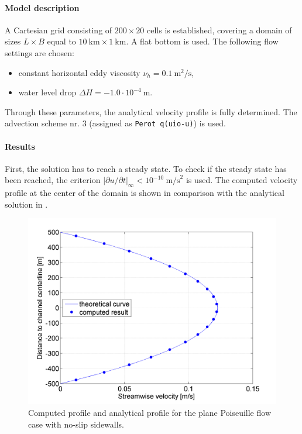 \paragraph*{Model description}
A Cartesian grid consisting of $200 \times 20$ cells is established, covering a domain of sizes $L \times B$ equal to $10~\textrm{km} \times 1~\textrm{km}$. A flat bottom is used. The following flow settings are chosen:
\begin{itemize}
\item constant horizontal eddy viscosity $\nu_h = 0.1~\textrm{m}^2/\textrm{s}$,
\item water level drop $\Delta H = -1.0\cdot10^{-4}~\textrm{m}$.
\end{itemize}
Through these parameters, the analytical velocity profile is fully determined. The advection scheme nr. 3 (assigned as \texttt{Perot q(uio-u)}) is used. 



\paragraph*{Results}
First, the solution has to reach a steady state. To check if the steady state has been reached, the criterion $|\partial u / \partial t |_{\infty} < 10^{-10}~\textrm{m/s}^2$ is used. The computed velocity profile at the center of the domain is shown in comparison with the analytical solution in .

\begin{figure}[h!]
\begin{center}
\includegraphics[width=0.65\columnwidth]{figures/poiseuillenoslip.png}
\end{center}\caption{Computed profile and analytical profile for the plane Poiseuille flow case with no-slip sidewalls. \label{fig:poiseuillenoslip}}
\end{figure}

